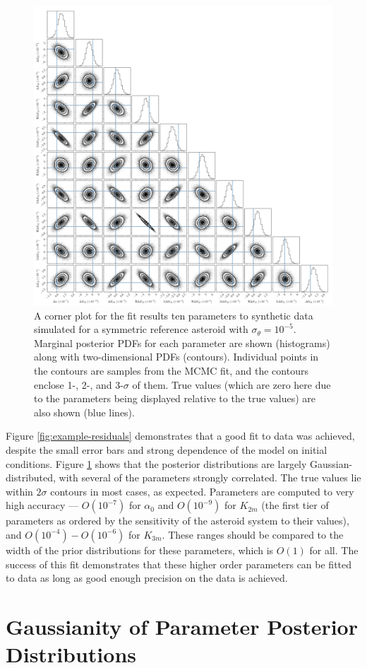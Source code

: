 \documentclass[linenumbers]{aastex631}
\begin{document}
\begin{figure}
  \centering
  \includegraphics[width=\textwidth]{example-corner.pdf}
  \caption{A corner plot for the fit results ten parameters to synthetic data simulated for a symmetric reference asteroid with $\sigma_\theta = 10^{-5}$. Marginal posterior PDFs for each parameter are shown (histograms) along with two-dimensional PDFs (contours). Individual points in the contours are samples from the MCMC fit, and the contours enclose 1-, 2-, and 3-$\sigma$ of them. True values (which are zero here due to the parameters being displayed relative to the true values) are also shown (blue lines).}
  \label{fig:example-corner}
\end{figure}

Figure \ref{fig:example-residuals} demonstrates that a good fit to data was achieved, despite the small error bars and strong dependence of the model on initial conditions. Figure \ref{fig:example-corner} shows that the posterior distributions are largely Gaussian-distributed, with several of the parameters strongly correlated. The true values lie within $2\sigma$ contours in most cases, as expected. Parameters are computed to very high accuracy --- $O(10^{-7})$ for $\alpha_0$ and $O(10^{-9})$ for $K_{2m}$ (the first tier of parameters as ordered by the sensitivity of the asteroid system to their values), and $O(10^{-4})-O(10^{-6})$ for $K_{3m}$. These ranges should be compared to the width of the prior distributions for these parameters, which is $O(1)$ for all. The success of this fit demonstrates that these higher order parameters can be fitted to data as long as good enough precision on the data is achieved.



\section{Gaussianity of Parameter Posterior Distributions}
\label{app:gaussian-posteriors}



{}

\end{document}
